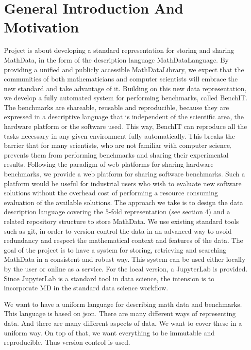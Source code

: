 \documentclass[12pt,twoside]{article}
\begin{document}
	
	\newpage
	\tableofcontents
	
	\newpage
	
	\section{General Introduction And Motivation}
	\par Project is about developing a standard representation for storing and sharing MathData, in the form of the description language
	MathDataLanguage. By providing a unified and publicly accessible MathDataLibrary, we expect that the communities of both
	mathematicians and computer scientists will embrace the new standard and take advantage of it. Building on this new data
	representation, we develop a fully automated system for performing benchmarks, called BenchIT. The benchmarks are shareable,
	reusable and reproducible, because they are expressed in a descriptive language that is independent of the scientific area, the
	hardware platform or the software used. This way, BenchIT can reproduce all the tasks necessary in any given environment fully
	automatically. This breaks the barrier that for many scientists, who are not familiar with computer science, prevents them from
	performing benchmarks and sharing their experimental results. Following the paradigm of web platforms for sharing hardware
	benchmarks, we provide a web platform for sharing software benchmarks. Such a platform would be useful for industrial users who
	wish to evaluate new software solutions without the overhead cost of performing a resource consuming evaluation of the available
	solutions. The approach we take is to design the data description language covering the 5-fold representation (see section 4) and a
	related repository structure to store MathData. We use existing standard tools such as git, in order to version control the data in an
	advanced way to avoid redundancy and respect the mathematical context and features of the data. 
	The goal of the project is to have a system for storing, retrieving and searching MathData in a consistent and robust way. 
	This system can be used either locally by the user or online as a service. 
	For the local version, a JupyterLab is provided. Since JupyterLab is a standard tool in data science, the intension is to incorporate MD in the standard data science workflow.
	\par We want to have a uniform language for describing math data and benchmarks. 
	This language is based on json. There are many different ways of representing data. And there are many different aspects of data.
	We want to cover these in a uniform way. On top of that, we want everything to be immutable and reproducible. 
	Thus version control is used. 
	
\end{document}
